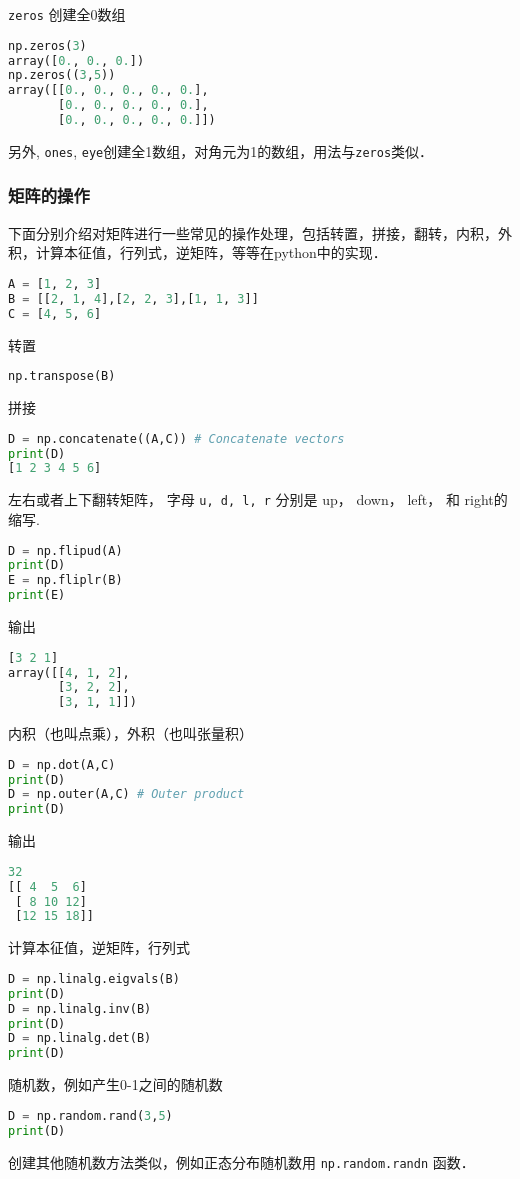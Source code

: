 \verb|zeros| 创建全0数组
\begin{lstlisting}[language=python]
np.zeros(3)
array([0., 0., 0.])
np.zeros((3,5))
array([[0., 0., 0., 0., 0.],
       [0., 0., 0., 0., 0.],
       [0., 0., 0., 0., 0.]])
\end{lstlisting} 
另外, \verb|ones|, \verb|eye|创建全1数组，对角元为1的数组，用法与\verb|zeros|类似．


\subsubsection{矩阵的操作}
下面分别介绍对矩阵进行一些常见的操作处理，包括转置，拼接，翻转，内积，外积，计算本征值，行列式，逆矩阵，等等在python中的实现．
\begin{lstlisting}[language=python]
A = [1, 2, 3]
B = [[2, 1, 4],[2, 2, 3],[1, 1, 3]]
C = [4, 5, 6]
\end{lstlisting}
转置
\begin{lstlisting}[language=python]
np.transpose(B)
\end{lstlisting}
拼接
\begin{lstlisting}[language=python]
D = np.concatenate((A,C)) # Concatenate vectors
print(D)
[1 2 3 4 5 6]
\end{lstlisting}
左右或者上下翻转矩阵， 字母 \verb|u, d, l, r| 分别是 up， down，  left， 和  right的缩写.
\begin{lstlisting}[language=python]
D = np.flipud(A) 
print(D)
E = np.fliplr(B) 
print(E)
\end{lstlisting}
输出
\begin{lstlisting}[language=python]
[3 2 1]
array([[4, 1, 2],
       [3, 2, 2],
       [3, 1, 1]])
\end{lstlisting}
内积（也叫点乘），外积（也叫张量积）
\begin{lstlisting}[language=python]
D = np.dot(A,C) 
print(D)
D = np.outer(A,C) # Outer product
print(D)
\end{lstlisting}
输出
\begin{lstlisting}[language=python]
32
[[ 4  5  6]
 [ 8 10 12]
 [12 15 18]]
\end{lstlisting}
计算本征值，逆矩阵，行列式
\begin{lstlisting}[language=python]
D = np.linalg.eigvals(B) 
print(D)
D = np.linalg.inv(B)
print(D)
D = np.linalg.det(B)
print(D)
\end{lstlisting}
随机数，例如产生0-1之间的随机数
\begin{lstlisting}[language=python]
D = np.random.rand(3,5) 
print(D)
\end{lstlisting}
创建其他随机数方法类似，例如正态分布随机数用 \verb|np.random.randn| 函数．

